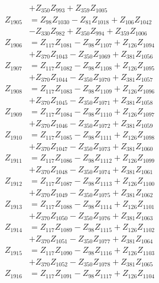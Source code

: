 \begin{multicols}{2}
\begin{align}
&+ Z_{350}Z_{993} + Z_{359}Z_{1005} \nonumber \\
Z_{1905} &= Z_{98}Z_{1030} - Z_{81}Z_{1018} + Z_{106}Z_{1042}  \nonumber \\
&- Z_{330}Z_{982} + Z_{350}Z_{994} + Z_{359}Z_{1006} \nonumber \\
Z_{1906} &= Z_{117}Z_{1081} - Z_{98}Z_{1107} + Z_{126}Z_{1094}  \nonumber \\
&+ Z_{370}Z_{1043} - Z_{350}Z_{1069} + Z_{381}Z_{1056} \nonumber \\
Z_{1907} &= Z_{117}Z_{1082} - Z_{98}Z_{1108} + Z_{126}Z_{1095}  \nonumber \\
&+ Z_{370}Z_{1044} - Z_{350}Z_{1070} + Z_{381}Z_{1057} \nonumber \\
Z_{1908} &= Z_{117}Z_{1083} - Z_{98}Z_{1109} + Z_{126}Z_{1096}  \nonumber \\
&+ Z_{370}Z_{1045} - Z_{350}Z_{1071} + Z_{381}Z_{1058} \nonumber \\
Z_{1909} &= Z_{117}Z_{1084} - Z_{98}Z_{1110} + Z_{126}Z_{1097}  \nonumber \\
&+ Z_{370}Z_{1046} - Z_{350}Z_{1072} + Z_{381}Z_{1059} \nonumber \\
Z_{1910} &= Z_{117}Z_{1085} - Z_{98}Z_{1111} + Z_{126}Z_{1098}  \nonumber \\
&+ Z_{370}Z_{1047} - Z_{350}Z_{1073} + Z_{381}Z_{1060} \nonumber \\
Z_{1911} &= Z_{117}Z_{1086} - Z_{98}Z_{1112} + Z_{126}Z_{1099}  \nonumber \\
&+ Z_{370}Z_{1048} - Z_{350}Z_{1074} + Z_{381}Z_{1061} \nonumber \\
Z_{1912} &= Z_{117}Z_{1087} - Z_{98}Z_{1113} + Z_{126}Z_{1100}  \nonumber \\
&+ Z_{370}Z_{1049} - Z_{350}Z_{1075} + Z_{381}Z_{1062} \nonumber \\
Z_{1913} &= Z_{117}Z_{1088} - Z_{98}Z_{1114} + Z_{126}Z_{1101}  \nonumber \\
&+ Z_{370}Z_{1050} - Z_{350}Z_{1076} + Z_{381}Z_{1063} \nonumber \\
Z_{1914} &= Z_{117}Z_{1089} - Z_{98}Z_{1115} + Z_{126}Z_{1102}  \nonumber \\
&+ Z_{370}Z_{1051} - Z_{350}Z_{1077} + Z_{381}Z_{1064} \nonumber \\
Z_{1915} &= Z_{117}Z_{1090} - Z_{98}Z_{1116} + Z_{126}Z_{1103}  \nonumber \\
&+ Z_{370}Z_{1052} - Z_{350}Z_{1078} + Z_{381}Z_{1065} \nonumber \\
Z_{1916} &= Z_{117}Z_{1091} - Z_{98}Z_{1117} + Z_{126}Z_{1104}  \nonumber \\

\end{align}
\end{multicols}
